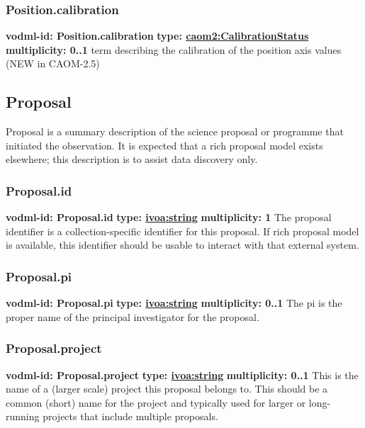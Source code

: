     \subsubsection{Position.calibration}
      \textbf{vodml-id: Position.calibration} \newline
      \textbf{type: \hyperref[sect:CalibrationStatus]{caom2:CalibrationStatus}} \newline
      \textbf{multiplicity: 0..1} \newline
      term describing the calibration of the position axis values (NEW in CAOM-2.5)

  \subsection{Proposal}
  \label{sect:Proposal}
    Proposal is a summary description of the science proposal or programme that initiated the observation. It is expected that a rich proposal model exists elsewhere; this description is to assist data discovery only.

    \subsubsection{Proposal.id}
      \textbf{vodml-id: Proposal.id} \newline
      \textbf{type: \hyperref[sect:ivoa]{ivoa:string}} \newline
      \textbf{multiplicity: 1} \newline
      The proposal identifier is a collection-specific identifier for this proposal. If rich proposal model is available, this identifier should be usable to interact with that external system.

    \subsubsection{Proposal.pi}
      \textbf{vodml-id: Proposal.pi} \newline
      \textbf{type: \hyperref[sect:ivoa]{ivoa:string}} \newline
      \textbf{multiplicity: 0..1} \newline
      The pi is the proper name of the principal investigator for the proposal.

    \subsubsection{Proposal.project}
      \textbf{vodml-id: Proposal.project} \newline
      \textbf{type: \hyperref[sect:ivoa]{ivoa:string}} \newline
      \textbf{multiplicity: 0..1} \newline
      This is the name of a (larger scale) project this proposal belongs to. This should be a common (short) name for the project and typically used for larger or long-running projects that include multiple proposals.

